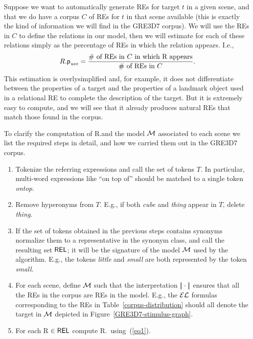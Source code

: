 Suppose we want to automatically generate REs for target $t$ in a given scene, and that we do have a corpus $C$ of REs for $t$ in that scene available (this is exactly the kind of information we will find in the GRE3D7 corpus).  We will use the REs in $C$ to define the relations 
in our model, then we will estimate \puse for each of these relations simply as the percentage of REs in which the relation appears.  I.e., 
\begin{equation}\label{eq1}
R.\textsf{p}_\textit{use} = \frac{\# \mbox{ of REs in $C$ in which R appears}}{\# \mbox{ of REs in $C$}}.
\end{equation}
This estimation is overlysimplified and, for example, it does not differentiate between the properties of a target and the properties of a landmark object used in a relational RE to complete the description of the target.  But it is extremely easy to compute, and we will see that 
it already produces natural REs that match those found in the corpus. 

To clarify the computation of R.\puse and the model $\mathcal{M}$ associated to each scene we list the required steps in detail, and how we carried them out in the GRE3D7 corpus.

\begin{enumerate}
\item Tokenize the referring expressions and call the set of tokens $T$. In particular, multi-word expressions like ``on top of'' should be matched to a single token \emph{ontop}.

\item Remove hyperonyms from $T$. E.g., if both \emph{cube} and \emph{thing} appear in $T$, delete \emph{thing}.

\item If the set of tokens obtained in the previous steps contains synonyms normalize them to a representative in the synonym class, and call the resulting set $\textsf{REL}$; it will be the signature of the model $\mathcal{M}$ used by the algorithm. E.g., the tokens \emph{little} and \emph{small} are both represented by the token \emph{small}.  

\item For each scene, define $\mathcal{M}$ such that the interpretation $|\!|\cdot|\!|$ ensures that all the REs in the corpus are REs in the model. E.g., the $\mathcal{EL}$ formulas corresponding to the REs in Table~\ref{corpus-distribution} should all denote the target in $\mathcal{M}$ depicted in 
Figure~\ref{GRE3D7-stimulus-graph}.

\item For each R $\in \textsf{REL}$ compute R.\puse\ using~(\ref{eq1}).   

\end{enumerate}

